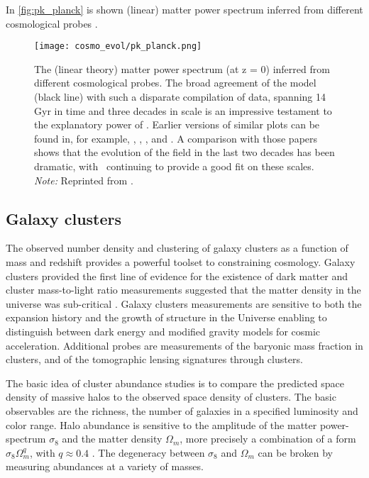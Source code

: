 In \autoref{fig:pk_planck} is shown (linear) matter power spectrum inferred from different cosmological probes \parencite{2018arXiv180706205P}.
\begin{figure}[hbt]
    \centering
    \texttt{[image: cosmo\_evol/pk\_planck.png]}
    \caption{The (linear theory) matter power spectrum (at z = 0) inferred from different cosmological probes. The broad agreement of the model (black line) with such a disparate compilation of data, spanning 14 Gyr in time and three decades in scale is an impressive testament to the explanatory power of \LCDM. Earlier versions of similar plots can be found in, for example, \textcite{1994ARA&A..32..319W}, \textcite{1995Sci...268..829S}, \textcite{2002PhRvD..66j3508T}, and \textcite{2004ApJ...606..702T}. A comparison with those papers shows that the evolution of the field in the last two decades has been dramatic, with \LCDM\ continuing to provide a good fit on these scales. \textit{Note:} Reprinted from \textcite{2018arXiv180706205P}.}
    \label{fig:pk_planck}
\end{figure}

\subsection{Galaxy clusters}
The observed number density and clustering of galaxy clusters as a function of mass and redshift provides a powerful toolset to constraining cosmology.  Galaxy clusters provided the first line of evidence for the existence of dark matter \textcite{zwicky} and cluster mass-to-light ratio measurements suggested that the matter density in the universe was sub-critical \textcite{Gott}. Galaxy clusters measurements are sensitive to both the expansion history and the growth of structure in the Universe enabling to distinguish between dark energy and modified gravity models for cosmic acceleration. Additional probes are measurements of the baryonic mass fraction in clusters, and of the tomographic lensing signatures through clusters.

The basic idea of cluster abundance studies is to compare the predicted space density of massive halos to the observed space density of clusters. The basic observables are the richness, the number of galaxies in a specified luminosity and color range. Halo abundance is sensitive to the amplitude of the matter power-spectrum $\sigma_8$ and the matter density $\Omega_m$, more precisely a combination of a form $\sigma_8\Omega_m^q$, with $q\approx0.4$ \textcite{white}. The degeneracy between $\sigma_8$ and $\Omega_m$ can be broken by measuring abundances at a variety of masses.

